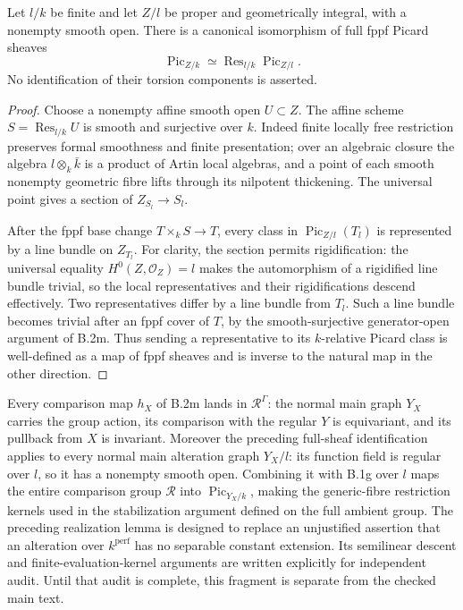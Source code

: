 \begin{lemma}
\label{B:Pic-finite-constants-sheaf}
Let $l/k$ be finite and let $Z/l$ be proper and geometrically
integral, with a nonempty smooth open.  There is a canonical
isomorphism of full fppf Picard sheaves
\[
 \operatorname{Pic}_{Z/k}\simeq
 \operatorname{Res}_{l/k}\operatorname{Pic}_{Z/l}.
\]
No identification of their torsion components is asserted.
\end{lemma}
\begin{proof}
Choose a nonempty affine smooth open $U\subset Z$.
The affine scheme $S=\operatorname{Res}_{l/k}U$ is smooth
and surjective over $k$.  Indeed finite locally free restriction
preserves formal smoothness and finite presentation; over an
algebraic closure the algebra $l\otimes_k\bar k$ is a product
of Artin local algebras, and a point of each smooth nonempty
geometric fibre lifts through its nilpotent thickening.
The universal point gives a section of $Z_{S_l}\to S_l$.

After the fppf base change $T\times_kS\to T$, every class in
$\operatorname{Pic}_{Z/l}(T_l)$ is represented by a line bundle
on $Z_{T_l}$.  For clarity, the section permits rigidification:
the universal equality $H^0(Z,\mathcal O_Z)=l$ makes the
automorphism of a rigidified line bundle trivial, so the local
representatives and their rigidifications descend effectively.
Two representatives differ by a line bundle from $T_l$.
Such a line bundle becomes trivial after an fppf cover of $T$,
by the smooth-surjective generator-open argument of B.2m.
Thus sending a representative to its $k$-relative Picard class
is well-defined as a map of fppf sheaves and is inverse to the
natural map in the other direction.
\end{proof}

\begin{remark}
Every comparison map $h_X$ of B.2m lands in
$\mathcal R^\Gamma$: the normal main graph $Y_X$ carries the
group action, its comparison with the regular $Y$ is
equivariant, and its pullback from $X$ is invariant.
Moreover the preceding full-sheaf identification applies to
every normal main alteration graph $Y_X/l$: its function field
is regular over $l$, so it has a nonempty smooth open.  Combining
it with B.1g over $l$ maps the entire comparison group
$\mathcal R$ into $\operatorname{Pic}_{Y_X/k}$, making the
generic-fibre restriction kernels used in the stabilization
argument defined on the full ambient group.
The preceding realization lemma is designed to replace an
unjustified assertion that an alteration over $k^{\mathrm{perf}}$
has no separable constant extension.  Its semilinear descent
and finite-evaluation-kernel arguments are written explicitly
for independent audit.  Until that audit is complete, this
fragment is separate from the checked main text.
\end{remark}
